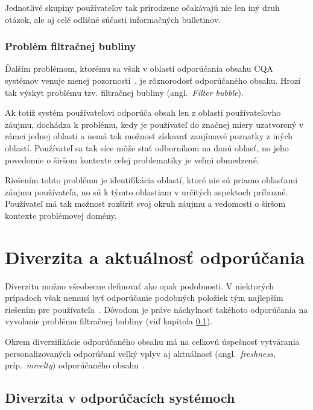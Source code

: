 Jednotlivé skupiny používateľov tak prirodzene očakávajú nie len iný druh otázok, ale aj celé odlišné súčasti informačných bulletinov.


\subsection{Problém filtračnej bubliny}\label{rec:filterbubble}

Ďalším problémom, ktorému sa však v oblasti odporúčania obsahu CQA systémov venuje menej pozornosti~\cite{Srba2016},
je rôznorodosť odporúčaného obsahu. Hrozí tak výskyt problému tzv. filtračnej bubliny (angl.~\emph{Filter bubble}).

Ak totiž systém používateľovi odporúča obsah len z oblastí používateľovho záujmu, dochádza k problému, kedy je používateľ
do značnej miery uzatvorený v rámci jednej oblasti a nemá tak možnosť získavať zaujímavé poznatky z iných oblastí.
Používateľ sa tak síce môže stať odborníkom na danú oblasť, no jeho povedomie o širšom kontexte celej problematiky
je veľmi obmedzené.

Riešením tohto problému je identifikácia oblastí, ktoré nie sú priamo oblasťami záujmu používateľa, no sú k týmto
oblastiam v určitých aspektoch príbuzné. Používateľ má tak možnosť rozšíriť svoj okruh záujmu a vedomosti o širšom
kontexte problémovej domény.




\chapter{Diverzita a aktuálnosť odporúčania}

Diverzitu možno všeobecne definovať ako opak podobnosti. V niektorých prípadoch však nemusí byť odporúčanie podobných
položiek tým najlepším riešením pre používateľa~\cite{Handbook2011}. Dôvodom je práve náchylnosť takéhoto odporúčania na
vyvolanie problému filtračnej bubliny (viď kapitola \ref{rec:filterbubble}).

Okrem diverzifikácie odporúčaného obsahu má na celkovú úspešnosť vytvárania personalizovaných odporúčaní veľký vplyv aj
aktuálnosť (angl.~\emph{freshness}, príp.~\emph{novelty}) odporúčaného obsahu~\cite{Liu2015}.

\section{Diverzita v odporúčacích systémoch}

